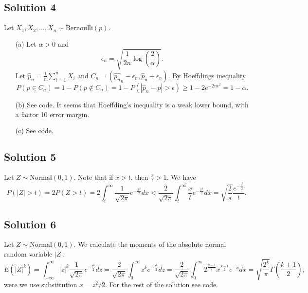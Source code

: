 \subsection*{Solution 4}

Let $X_1, X_2, ..., X_n \sim \mathrm{Bernoulli}(p)$.

\begin{itemize}
\item[(a)] Let $\alpha > 0$ and
\begin{equation*}
\epsilon_n = \sqrt{\frac{1}{2n} \log\left(\frac{2}{\alpha}\right)}.
\end{equation*}
Let $\hat{p}_n = \frac{1}{n}\sum_{i=1}^n X_i$ and $C_n = (\hat{p_n}_n - \epsilon_n, \hat{p}_n + \epsilon_n)$.
By Hoeffdings inequality
\begin{equation*}
P(p \in C_n) = 1 - P(p \notin C_n)
    = 1 - P(|\hat{p}_n - p| > \epsilon)
    \geq 1 - 2e^{-2n\epsilon^2}
    = 1 - \alpha.
\end{equation*}
\item[(b)] See code. It seems that Hoeffding's inequality is a weak lower bound, with a factor 10 error margin.
\item[(c)] See code.
\end{itemize}


\subsection*{Solution 5}

Let $Z \sim \mathrm{Normal}(0, 1)$.
Note that if $x > t$, then $\frac{x}{t} > 1$.
We have
\begin{equation*}
    P(|Z| > t) = 2P(Z > t)
        = 2 \int_t^{\infty} \frac{1}{\sqrt{2\pi}} e^{-\frac{x^2}{2}} dx
        < \frac{2}{\sqrt{2\pi}} \int_t^{\infty} \frac{x}{t} e^{-\frac{x^2}{2}} dx
        = \sqrt{\frac{2}{\pi}} \frac{e^{-\frac{t^2}{2}}}{t}.
\end{equation*}


\subsection*{Solution 6}

Let $Z \sim \mathrm{Normal}(0, 1)$.
We calculate the moments of the absolute normal random variable $|Z|$.
\begin{equation*}
    E(|Z|^k) = \int_{-\infty}^{\infty} |z|^k \frac{1}{\sqrt{2\pi}} e^{-\frac{z^2}{2}} dz
        = \frac{2}{\sqrt{2\pi}} \int_0^{\infty} z^k e^{-\frac{z^2}{2}} dz
        = \frac{2}{\sqrt{2\pi}} \int_0^{\infty} 2^{\frac{k - 1}{2}} x^{\frac{k - 1}{2}} e^{-x} dx
        = \sqrt{\frac{2^{k}}{\pi}} \Gamma\left(\frac{k+1}{2}\right),
\end{equation*}
were we use substitution $x = z^2/2$.
For the rest of the solution see code.
